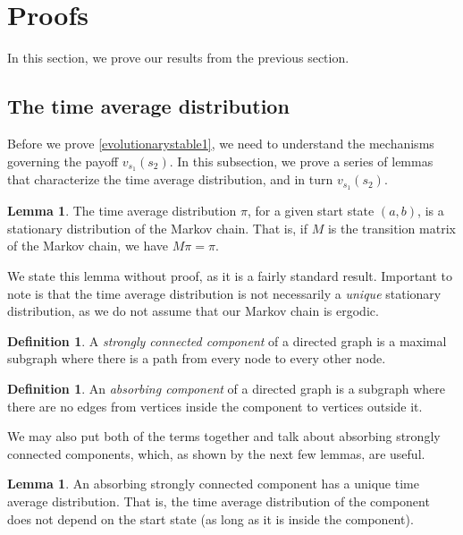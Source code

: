 \documentclass[12pt]{article}
\theoremstyle{definition}
\newtheorem{definition}[theorem]{Definition}
\newtheorem{lemma}[theorem]{Lemma}
\theoremstyle{remark}
\begin{document}
\section{Proofs}
\label{sectionproofs}

In this section, we prove our results from the previous section.

\subsection{The time average distribution}

Before we prove \cref{evolutionarystable1}, we need to understand the mechanisms governing the payoff $v_{s_1}(s_2)$. In this subsection, we prove a series of lemmas that characterize the time average distribution, and in turn $v_{s_1}(s_2)$.

\begin{lemma}
  \label{timeaverageisstationary}
  The time average distribution $\pi$, for a given start state $(a,b)$, is a stationary distribution of the Markov chain. That is, if $M$ is the transition matrix of the Markov chain, we have $M \pi = \pi$.
\end{lemma}

We state this lemma without proof, as it is a fairly standard result. Important to note is that the time average distribution is not necessarily a \textit{unique} stationary distribution, as we do not assume that our Markov chain is ergodic.

\begin{definition}
  A \textit{strongly connected component} of a directed graph is a maximal subgraph where there is a path from every node to every other node.
\end{definition}

\begin{definition}
  An \textit{absorbing component} of a directed graph is a subgraph where there are no edges from vertices inside the component to vertices outside it.
\end{definition}

We may also put both of the terms together and talk about absorbing strongly connected components, which, as shown by the next few lemmas, are useful.

\begin{lemma}
  \label{lemmaabsorbinghasuniquetimeaverage}
  An absorbing strongly connected component has a unique time average distribution. That is, the time average distribution of the component does not depend on the start state (as long as it is inside the component).
\end{lemma}
\end{document}
